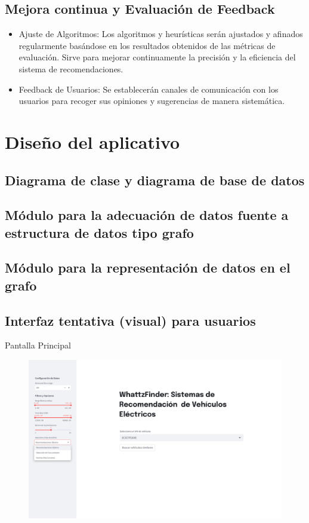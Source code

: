 \documentclass[12pt]{article}
\begin{document}
\subsection{Mejora continua y Evaluación de Feedback}
\begin{itemize}
    \item Ajuste de Algoritmos: Los algoritmos y heurísticas serán ajustados y afinados regularmente basándose en los resultados obtenidos de las métricas de evaluación. Sirve para mejorar continuamente la precisión y la eficiencia del sistema de recomendaciones.
    \item Feedback de Usuarios: Se establecerán canales de comunicación con los usuarios para recoger sus opiniones y sugerencias de manera sistemática.
\end{itemize}




\section{Diseño del aplicativo}
\subsection{Diagrama de clase y diagrama de base de datos}
\subsection{Módulo para la adecuación de datos fuente a estructura de datos tipo grafo}
\subsection{Módulo para la representación de datos en el grafo}
\subsection{Interfaz tentativa (visual) para usuarios}

Pantalla Principal
\begin{figure}[htbp]
    \centering
    \includegraphics[width=\textwidth]{./imgs-latex/img1.png}\label{fig:img1}
\end{figure}
\end{document}
